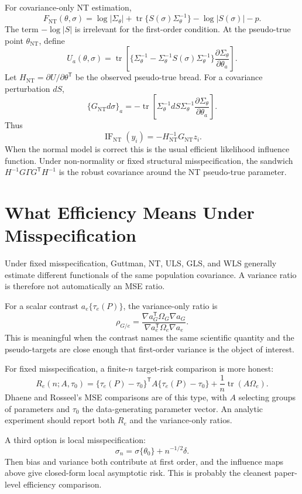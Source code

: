 \documentclass[11pt]{article}
\newcommand{\T}{^{\mathsf T}}
\newcommand{\tr}{\operatorname{tr}}
\newcommand{\IF}{\operatorname{IF}}
\theoremstyle{plain}
\theoremstyle{remark}
\begin{document}
For covariance-only NT estimation,
\[
  F_{\mathrm{NT}}(\theta,\sigma)
    =
  \log|\Sigma_\theta|
  +\tr\{S(\sigma)\Sigma_\theta^{-1}\}
  -\log|S(\sigma)|-p.
\]
The term \(-\log|S|\) is irrelevant for the first-order condition. At the
pseudo-true point \(\theta_{\mathrm{NT}}\), define
\[
  U_a(\theta,\sigma)
    =
  \tr\left[
    \{\Sigma_\theta^{-1}
      -\Sigma_\theta^{-1}S(\sigma)\Sigma_\theta^{-1}\}
    \frac{\partial\Sigma_\theta}{\partial\theta_a}
  \right].
\]
Let \(H_{\mathrm{NT}}=\partial U/\partial\theta\T\) be the observed
pseudo-true bread. For a covariance perturbation \(dS\),
\[
  \{G_{\mathrm{NT}}d\sigma\}_a
    =
  -\tr\left[
    \Sigma_\theta^{-1}dS\Sigma_\theta^{-1}
    \frac{\partial\Sigma_\theta}{\partial\theta_a}
  \right].
\]
Thus
\[
  \IF_{\mathrm{NT}}(y_i)
    =
  -H_{\mathrm{NT}}^{-1}G_{\mathrm{NT}}z_i.
\]
When the normal model is correct this is the usual efficient likelihood
influence function. Under non-normality or fixed structural misspecification,
the sandwich \(H^{-1}G\Gamma G\T H^{-1}\) is the robust covariance around the
NT pseudo-true parameter.

\section{What Efficiency Means Under Misspecification}

Under fixed misspecification, Guttman, NT, ULS, GLS, and WLS generally estimate
different functionals of the same population covariance. A variance ratio is
therefore not automatically an MSE ratio.

For a scalar contrast \(a_e\{\tau_e(P)\}\), the variance-only ratio is
\[
  \rho_{G/e}
    =
  \frac{\nabla a_G\T \Omega_G \nabla a_G}
       {\nabla a_e\T \Omega_e \nabla a_e}.
\]
This is meaningful when the contrast names the same scientific quantity and
the pseudo-targets are close enough that first-order variance is the object of
interest.

For fixed misspecification, a finite-\(n\) target-risk comparison is more
honest:
\[
  R_e(n;A,\tau_0)
    =
  \{\tau_e(P)-\tau_0\}\T A\{\tau_e(P)-\tau_0\}
  +\frac1n\tr(A\Omega_e).
\]
Dhaene and Rosseel's MSE comparisons are of this type, with \(A\) selecting
groups of parameters and \(\tau_0\) the data-generating parameter vector. An
analytic experiment should report both \(R_e\) and the variance-only ratios.

A third option is local misspecification:
\[
  \sigma_n=\sigma\{\theta_0\}+n^{-1/2}\delta.
\]
Then bias and variance both contribute at first order, and the influence maps
above give closed-form local asymptotic risk. This is probably the cleanest
paper-level efficiency comparison.
\end{document}
